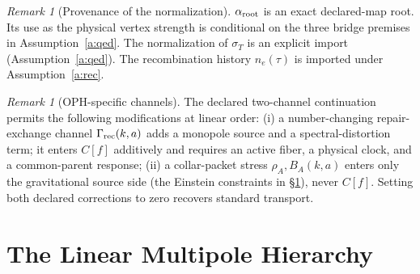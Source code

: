\documentclass[11pt]{article}
\theoremstyle{remark}
\newtheorem{remark}[theorem]{Remark}
\begin{document}
\begin{remark}[Provenance of the normalization]
$\alpha_{\rm root}$ is an exact declared-map root. Its use as the physical
vertex strength is conditional on the three bridge premises in
Assumption~\ref{a:qed}. The normalization of $\sigma_T$ is an explicit
import (Assumption~\ref{a:qed}). The recombination history $n_e(\tau)$ is imported under
Assumption~\ref{a:rec}.
\end{remark}

\begin{remark}[OPH-specific channels]\label{r:channels}
The declared two-channel continuation permits the following modifications
at linear order:
(i) a number-changing repair-exchange channel $\Gamma_{\rm rec}(k,a)$ adds a
monopole source and a spectral-distortion term; it enters $C[f]$
additively and requires an active fiber, a physical clock, and a
common-parent response;
(ii) a collar-packet stress $\rho_A,B_A(k,a)$ enters only the gravitational
source side (the Einstein constraints in \S\ref{s:hierarchy}), never $C[f]$.
Setting both declared corrections to zero recovers standard transport.
\end{remark}

\section{The Linear Multipole Hierarchy}\label{s:hierarchy}
\end{document}
